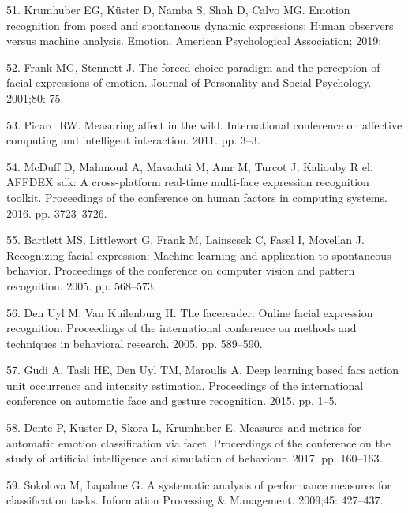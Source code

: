 \documentclass[10pt,letterpaper]{article}
\begin{document}
\leavevmode\hypertarget{ref-krumhuber2019emotion}{}%
51. Krumhuber EG, Küster D, Namba S, Shah D, Calvo MG. Emotion recognition from posed and spontaneous dynamic expressions: Human observers versus machine analysis. Emotion. American Psychological Association; 2019;

\leavevmode\hypertarget{ref-frank2001forced}{}%
52. Frank MG, Stennett J. The forced-choice paradigm and the perception of facial expressions of emotion. Journal of Personality and Social Psychology. 2001;80: 75.

\leavevmode\hypertarget{ref-picard2011measuring}{}%
53. Picard RW. Measuring affect in the wild. International conference on affective computing and intelligent interaction. 2011. pp. 3--3.

\leavevmode\hypertarget{ref-mcduff2016affdex}{}%
54. McDuff D, Mahmoud A, Mavadati M, Amr M, Turcot J, Kaliouby R el. AFFDEX sdk: A cross-platform real-time multi-face expression recognition toolkit. Proceedings of the conference on human factors in computing systems. 2016. pp. 3723--3726.

\leavevmode\hypertarget{ref-bartlett2005recognizing}{}%
55. Bartlett MS, Littlewort G, Frank M, Lainscsek C, Fasel I, Movellan J. Recognizing facial expression: Machine learning and application to spontaneous behavior. Proceedings of the conference on computer vision and pattern recognition. 2005. pp. 568--573.

\leavevmode\hypertarget{ref-den2005facereader}{}%
56. Den Uyl M, Van Kuilenburg H. The facereader: Online facial expression recognition. Proceedings of the international conference on methods and techniques in behavioral research. 2005. pp. 589--590.

\leavevmode\hypertarget{ref-gudi2015deep}{}%
57. Gudi A, Tasli HE, Den Uyl TM, Maroulis A. Deep learning based facs action unit occurrence and intensity estimation. Proceedings of the international conference on automatic face and gesture recognition. 2015. pp. 1--5.

\leavevmode\hypertarget{ref-dente2017measures}{}%
58. Dente P, Küster D, Skora L, Krumhuber E. Measures and metrics for automatic emotion classification via facet. Proceedings of the conference on the study of artificial intelligence and simulation of behaviour. 2017. pp. 160--163.

\leavevmode\hypertarget{ref-sokolova2009systematic}{}%
59. Sokolova M, Lapalme G. A systematic analysis of performance measures for classification tasks. Information Processing \& Management. 2009;45: 427--437.
\end{document}
